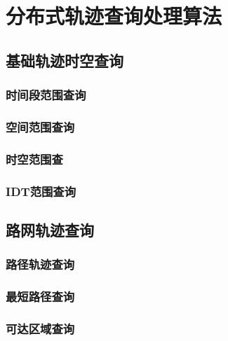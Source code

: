 \chapter{分布式轨迹查询处理算法}
\section{基础轨迹时空查询}
\subsection{时间段范围查询}
\subsection{空间范围查询}
\subsection{时空范围查}
\subsection{IDT范围查询}
\section{路网轨迹查询}
\subsection{路径轨迹查询}
\subsection{最短路径查询}
\subsection{可达区域查询}